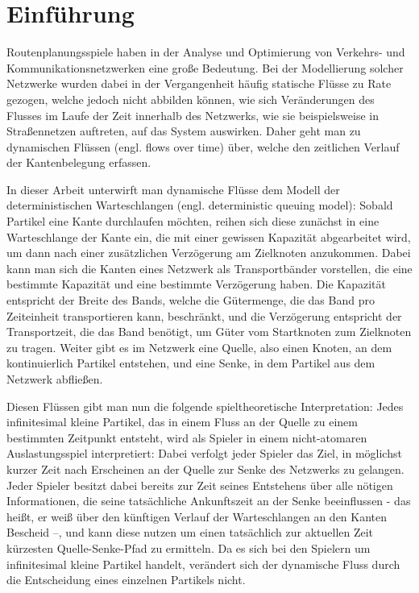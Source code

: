\chapter{Einführung}\label{introduction}

Routenplanungsspiele haben in der Analyse und Optimierung von Verkehrs- und Kommunikationsnetzwerken eine große Bedeutung.
Bei der Modellierung solcher Netzwerke wurden dabei in der Vergangenheit häufig statische Flüsse zu Rate gezogen, welche jedoch nicht abbilden können, wie sich Veränderungen des Flusses im Laufe der Zeit innerhalb des Netzwerks, wie sie beispielsweise in Straßennetzen auftreten, auf das System auswirken.
Daher geht man zu dynamischen Flüssen (engl. flows over time) über, welche den zeitlichen Verlauf der Kantenbelegung erfassen.

In dieser Arbeit unterwirft man dynamische Flüsse dem Modell der deterministischen Warteschlangen (engl. deterministic queuing model):
Sobald Partikel eine Kante durchlaufen möchten, reihen sich diese zunächst in eine Warteschlange der Kante ein, die mit einer gewissen Kapazität abgearbeitet wird, um dann nach einer zusätzlichen Verzögerung am Zielknoten anzukommen.
Dabei kann man sich die Kanten eines Netzwerk als Transportbänder vorstellen, die eine bestimmte Kapazität und eine bestimmte Verzögerung haben.
Die Kapazität entspricht der Breite des Bands, welche die Gütermenge, die das Band pro Zeiteinheit transportieren kann,  beschränkt, und die Verzögerung entspricht der Transportzeit, die das Band benötigt, um Güter vom Startknoten zum Zielknoten zu tragen.
Weiter gibt es im Netzwerk eine Quelle, also einen Knoten, an dem kontinuierlich Partikel entstehen, und eine Senke, in dem Partikel aus dem Netzwerk abfließen.

Diesen Flüssen gibt man nun die folgende spieltheoretische Interpretation:
Jedes infinitesimal kleine Partikel, das in einem Fluss an der Quelle zu einem bestimmten Zeitpunkt entsteht, wird als Spieler in einem nicht-atomaren Auslastungsspiel interpretiert:
Dabei verfolgt jeder Spieler das Ziel, in möglichst kurzer Zeit nach Erscheinen an der Quelle zur Senke des Netzwerks zu gelangen.
Jeder Spieler besitzt dabei bereits zur Zeit seines Entstehens über alle nötigen Informationen, die seine tatsächliche Ankunftszeit an der Senke beeinflussen - das heißt, er weiß über den künftigen Verlauf der Warteschlangen an den Kanten Bescheid --, und kann diese nutzen um einen tatsächlich zur aktuellen Zeit kürzesten Quelle-Senke-Pfad zu ermitteln.
Da es sich bei den Spielern um infinitesimal kleine Partikel handelt, verändert sich der dynamische Fluss durch die Entscheidung eines einzelnen Partikels nicht.

